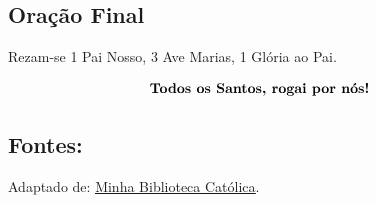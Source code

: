 \documentclass[a4paper,14pt]{extarticle} \usepackage[utf8]{inputenc}
\begin{document}
\subsection{Oração Final} \label{oracao-final}

\begin{center}
  Rezam-se 1 Pai Nosso, 3 Ave Marias, 1 Glória ao Pai.
\end{center}

\[
\textbf{Todos os Santos, \textbf{rogai por nós!}}
\]

\vfill

\begin{center}
\subsection*{Fontes:}
Adaptado de: \underline{\href{https://bibliotecacatolica.com.br/blog/novenas/novena-de-todos-os-santos/}{Minha Biblioteca Católica}}.
\end{center}
\end{document}
